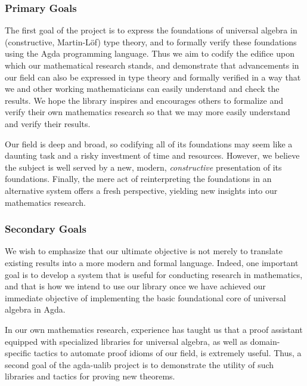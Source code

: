 \documentclass[sigplan,screen]{acmart}
\begin{document}
\subsubsection{Primary Goals}\label{primary-goals}
The first goal of the project is to express the foundations of universal algebra in (constructive, Martin-L\"of) type theory, and to formally verify these foundations using the Agda programming language. Thus we aim to codify the edifice upon which our mathematical research stands, and demonstrate that advancements in our field can also be expressed in type theory and formally verified in a way that we and other working mathematicians can easily understand and check the results. We hope the library inspires and encourages others to formalize and verify their own mathematics research so that we may more easily understand and verify their results.

Our field is deep and broad, so codifying all of its foundations may seem like a daunting task and a risky investment of time and resources. However, we believe the subject is well served by a new, modern, \emph{constructive} presentation of its foundations.  Finally, the mere act of reinterpreting the foundations in an alternative system offers a fresh perspective, yielding new insights into our mathematics research.


\subsubsection{Secondary Goals}\label{secondary-goals}
We wish to emphasize that our ultimate objective is not merely to translate existing results into a more modern and formal language. Indeed, one important goal is to develop a system that is useful for conducting research in mathematics, and that is how we intend to use our library once we have achieved our immediate objective of implementing
the basic foundational core of universal algebra in Agda.

In our own mathematics research, experience has taught us that a proof assistant equipped with specialized libraries for universal algebra, as well as domain-specific tactics to automate proof idioms of our field, is extremely useful. Thus, a second goal of the agda-ualib project is to demonstrate the utility of such libraries and tactics for proving new theorems.
\end{document}
